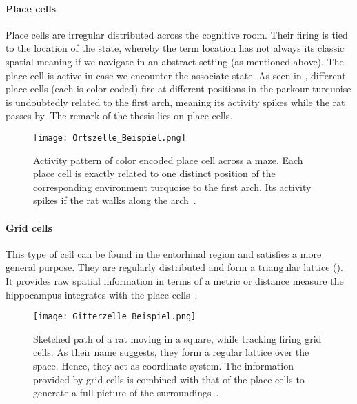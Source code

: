 \paragraph{Place cells} \label{par: Place cell}
Place cells are irregular distributed across the cognitive room. Their firing is tied to the location of the state, whereby the term location has not always its classic spatial meaning if we navigate in an abstract setting (as mentioned above). The place cell is active in case we encounter the associate state. As seen in \figref{\ref{fig: Rat in maze}}, different place cells (each is color coded) fire at different positions in the parkour \eg turquoise is undoubtedly related to the first arch, meaning its activity spikes while the rat passes by. The remark of the thesis lies on place cells.
\begin{figure}
	\centering
		\texttt{[image: Ortszelle\_Beispiel.png]}
	\caption{Activity pattern of color encoded place cell across a maze. Each place cell is exactly related to one distinct position of the corresponding environment \eg turquoise to the first arch. Its activity spikes if the rat walks along the arch~\cite{Stuartlayton13}.}
	\label{fig: Rat in maze}
\end{figure}
\paragraph{Grid cells}
This type of cell can be found in the entorhinal region and satisfies a more general purpose. They are regularly distributed and form a triangular lattice (\figref{\ref{fig: Grid cells}}). It provides raw spatial information in terms of a metric or distance measure the hippocampus integrates with the place cells~\cite{ORFrHa20CCN, BellmundEtAl18NC}.
\begin{figure}
	\centering
		\texttt{[image: Gitterzelle\_Beispiel.png]}
	\caption{Sketched path of a rat moving in a square, while tracking firing grid cells. As their name suggests, they form a regular lattice over the space. Hence, they act as coordinate system. The information provided by grid cells is combined with that of the place cells to generate a full picture of the surroundings~\cite{Moser15PGM}.}
	\label{fig: Grid cells}
\end{figure}
